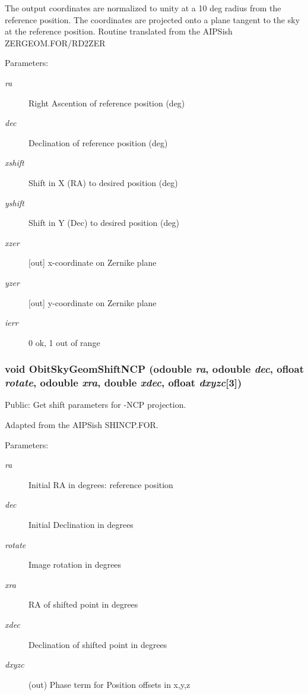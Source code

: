 The output coordinates are normalized to unity at a 10 deg radius from the reference position. The coordinates are projected onto a plane tangent to the sky at the reference position. Routine translated from the AIPSish ZERGEOM.FOR/RD2ZER \begin{Desc}
\item[Parameters:]
\begin{description}
\item[{\em ra}]Right Ascention of reference position (deg) \item[{\em dec}]Declination of reference position (deg) \item[{\em xshift}]Shift in X (RA) to desired position (deg) \item[{\em yshift}]Shift in Y (Dec) to desired position (deg) \item[{\em xzer}][out] x-coordinate on Zernike plane \item[{\em yzer}][out] y-coordinate on Zernike plane \item[{\em ierr}]0 ok, 1 out of range \end{description}
\end{Desc}
\subsubsection{\setlength{\rightskip}{0pt plus 5cm}void Obit\-Sky\-Geom\-Shift\-NCP ({\bf odouble} {\em ra}, {\bf odouble} {\em dec}, {\bf ofloat} {\em rotate}, {\bf odouble} {\em xra}, double {\em xdec}, {\bf ofloat} {\em dxyzc}[3])}\label{ObitSkyGeom_8c_a6}


Public: Get shift parameters for -NCP projection. 

Adapted from the AIPSish SHINCP.FOR. \begin{Desc}
\item[Parameters:]
\begin{description}
\item[{\em ra}]Initial RA in degrees: reference position \item[{\em dec}]Initial Declination in degrees \item[{\em rotate}]Image rotation in degrees \item[{\em xra}]RA of shifted point in degrees \item[{\em xdec}]Declination of shifted point in degrees \item[{\em dxyzc}](out) Phase term for Position offsets in x,y,z \end{description}
\end{Desc}
